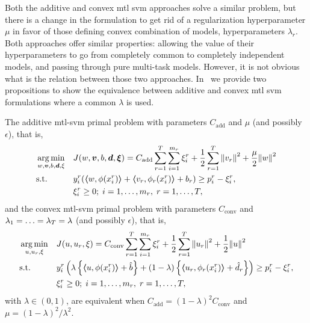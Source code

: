 Both the {additive} and {convex} \acrshort{mtl} \acrshort{svm} approaches solve a similar problem, but there is a change in the formulation to get rid of a regularization hyperparameter $\mu$ in favor of those defining convex combination of models, hyperparameters $\lambda_r$.
Both approaches offer similar properties: allowing the value of their hyperparameters to go from completely common to completely independent models, and passing through pure multi-task models.
However, it is not obvious what is the relation between those two approaches.
In~\cite{RuizAD19} we provide two propositions to show the equivalence between {additive} and {convex} \acrshort{mtl} \acrshort{svm} formulations where a common $\lambda$ is used.
\begin{prop}\label{prop:add_conv_equiv}
    The {additive} \acrshort{mtl}-\acrshort{svm} primal problem with parameters $C_\text{add}$ and $\mu$ (and possibly $\epsilon$), that is,
    \begin{equation}\label{eq:svmmtl_primal_add_equiv}
        \begin{aligned}
        & \argmin_{w, \fv{v}, b, \fv{d}, \xi}
        & & {J({w}, \fv{v}, b, \fv{d}, \fv{\xi}) = C_\text{add} \sum_{r= 1}^T \sum_{i=1}^{m_r} {\xi_{i}^r} + \frac{1}{2} \sum_{r= 1}^T{\norm{{v}_r}^2} + \frac{\mu}{2} {\norm{{w}}}^2} \\
        & \text{s.t.}
        & & y_{i}^r (\dotp{w}{\phi(x_{i}^r)}  + \dotp{{v}_r}{\phi_r(x_{i}^r)} + b_r) \geq p_{i}^r - \xi_{i}^r ,  \\
        & & & \xi_{i}^r \geq 0; \;  i=1 , \dotsc , m_r, \;  r= 1,\dotsc, T  , \\
        \end{aligned}
    \end{equation}
    and the {convex} \acrshort{mtl}-\acrshort{svm} primal problem with parameters $C_\text{conv}$ and $\lambda_1=\ldots=\lambda_T = \lambda$ (and possibly $\epsilon$), that is,
    \begin{equation}\label{eq:svmmtl_primal_convex_equiv}
        \begin{aligned}
        & \argmin_{u, {u}_r, \xi}
        & & {J({u}, {u}_r, \xi) = C_\text{conv} \sum_{r= 1}^T \sum_{i=1}^{m_r} {\xi_{i}^r} + \frac{1}{2} \sum_{r= 1}^T{\norm{{u}_r}^2} + \frac{1}{2} {\norm{{u}}}^2} \\
        & \text{s.t.}
        & & y_{i}^r \left(\lambda \left\lbrace \dotp{u}{\phi(x_{i}^r)} + \hat{b} \right\rbrace + (1 - \lambda) \left\lbrace \dotp{{u}_r}{\phi_r(x_{i}^r)} + \hat{d}_r \right\rbrace  \right) \geq p_{i}^r - \xi_{i}^r ,  \\
        & & & \xi_{i}^r \geq 0; \;  i=1 , \dotsc , m_r, \;  r= 1,\dotsc, T  , \\
        \end{aligned}
    \end{equation}
    with $\lambda \in (0, 1)$, are equivalent when $C_\text{add} = (1 - \lambda)^2 C_\text{conv}$ and $\mu = (1 - \lambda)^2 / \lambda^2$.
    \label{thm_equiv}
\end{prop}
